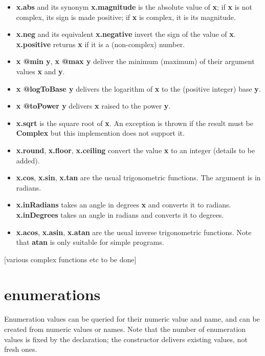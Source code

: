 \documentclass{report}
\begin{document}
\begin{itemize}\item {\bf x.abs} and its synonym {\bf x.magnitude} is the absolute value of {\bf x}; if {\bf x} is
not complex, its sign is made positive; if {\bf x} is complex, it is its
magnitude.

\item {\bf x.neg} and its equivalent {\bf x.negative} invert the sign of the value
of {\bf x}. {\bf x.positive} returns {\bf x} if it is a (non-complex) number.

\item {\bf x @min y}, {\bf x @max y} deliver the minimum (maximum) of their argument
values {\bf x} and {\bf y}.

\item {\bf x @logToBase y} delivers the logarithm of {\bf x} to the (positive
integer) base {\bf y}.

\item {\bf x @toPower y} delivers {\bf x} raised to the power {\bf y}.

\item {\bf x.sqrt} is the square root of {\bf x}. An exception is thrown if the result
must be {\bf Complex} but this implemention does not support it.

\item {\bf x.round}, {\bf x.floor}, {\bf x.ceiling} convert the value {\bf x} to an integer
(details to be added).

\item {\bf x.cos}, {\bf x.sin}, {\bf x.tan} are the usual trigonometric functions. The
argument is in radians.

\item {\bf x.inRadians} takes an angle in degrees {\bf x} and converts it to
radians. {\bf x.inDegrees} takes an angle in radians and converts it to
degrees.

\item {\bf x.acos}, {\bf x.asin}, {\bf x.atan} are the usual inverse trigonometric
functions. Note that {\bf atan} is only suitable for simple programs.

\end{itemize}{[}various complex functions etc to be done{]}\section{enumerations}


Enumeration values can be queried for their numeric value and name, and can be
created from numeric values or names. Note that the number of enumeration
values is fixed by the declaration; the constructor delivers existing values,
not fresh ones.
\end{document}
